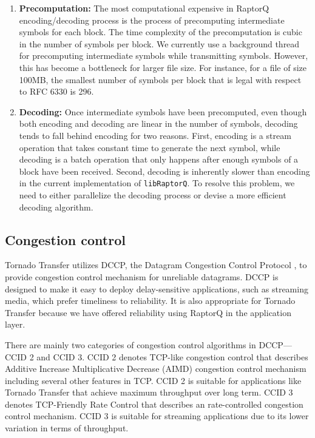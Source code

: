 \documentclass{sig-alternate-10pt}
\begin{document}
\begin{enumerate}[label=(\alph*)]
\item \textbf{Precomputation:} The most computational expensive in RaptorQ encoding/decoding process is the process of precomputing intermediate symbols for each block. The time complexity of the precomputation is cubic in the number of symbols per block. We currently use a background thread for precomputing intermediate symbols while transmitting symbols. However, this has become a bottleneck for larger file size. For instance, for a file of size 100MB, the smallest number of symbols per block that is legal with respect to RFC 6330 is 296.
\item \textbf{Decoding:} Once intermediate symbols have been precomputed, even though both encoding and decoding are linear in the number of symbols, decoding tends to fall behind encoding for two reasons. First, encoding is a stream operation that takes constant time to generate the next symbol, while decoding is a batch operation that only happens after enough symbols of a block have been received. Second, decoding is inherently slower than encoding in the current implementation of \texttt{libRaptorQ}. To resolve this problem, we need to either parallelize the decoding process or devise a more efficient decoding algorithm.
\end{enumerate}

\subsection{Congestion control}
Tornado Transfer utilizes DCCP, the Datagram Congestion Control Protocol
\cite{DCCP}, to
provide congestion control mechanism for unreliable datagrams. DCCP is designed
to make it easy to deploy delay-sensitive applications, such as streaming media,
which prefer timeliness to reliability. It is also appropriate for Tornado
Transfer because we have offered reliability using RaptorQ in the application
layer. 

There are mainly two categories of congestion control algorithms in DCCP--- CCID
2 and CCID 3. CCID 2 denotes TCP-like congestion control that describes Additive
Increase Multiplicative Decrease (AIMD) congestion control mechanism including
several other features in TCP. CCID 2 is suitable for applications like Tornado
Transfer that achieve maximum throughput over long term. CCID 3 denotes
TCP-Friendly Rate Control that describes an rate-controlled congestion control
mechanism. CCID 3 is suitable for streaming applications due to its lower
variation in terms of throughput.
\end{document}

